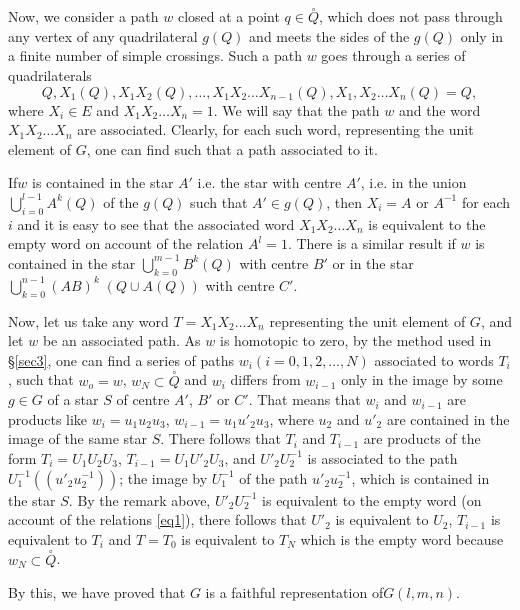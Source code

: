  Now, we consider a path $w$ closed at a point $q \in  \overset{\circ}{Q}$,
 which does not pass through any vertex of any quadrilateral $g(Q)$ and
 meets the sides of the $g(Q)$ only in a finite number of simple
 crossings. Such a path $w$ goes through a series of quadrilaterals 
 $$
Q, X_1 (Q), X_1 X_2 (Q), \ldots, X_1 X_2 \ldots X_{n-1}(Q), X_1, X_2
\ldots X_n (Q) = Q, 
 $$  
 where $X_i \in E$ and $X_1 X_2 \ldots X_n =1$. We will say that the
 path $w$ and  the word $X_1 X_2 \ldots X_n$ are associated. Clearly,
 for each such word, representing the unit element of $G$, one can find
 such that a path associated to it. 
 
 If\pageoriginale $w$ is contained in the star $A'$ i.e. the star with
 centre $A'$, i.e. in the union $\bigcup\limits_{i=0}^{l-1} A^k (Q)$
 of the $g(Q)$ such that $A' \in g(Q)$, then $X_i = A$ or $A^{-1}$ for
 each $i$ and 
 it is easy to  see that the associated word $X_1 X_2 \ldots X_n$ is
 equivalent to the empty word on account of the relation $A^l =
 1$. There is a similar result if $w$ is contained in the star
 $\bigcup\limits_{k=0}^{m-1} B^k(Q)$ with centre $B'$ or in the star
 $\bigcup\limits_{k=0}^{n-1} (AB)^k \; (Q \cup A(Q))$ with centre $C'$. 
 
 Now, let us take any word $T = X_1 X_2 \ldots X_n$ representing the
 unit element of $G$, and let $w$ be an associated path. As $w$ is
 homotopic to zero, by the method used in \S \ref{sec3}, one can find a series
 of paths $w_i (i = 0, 1, 2, \ldots, N)$ associated to words $T_i$,
 such that $w_o = w$, $w_N \subset \overset{\circ}{Q}$ and $w_i$ differs
 from $w_{i-1}$ only in the image by some $g \in G$ of a star $S$ of
 centre $A'$, $B'$ or $C'$. That means that $w_i$ and $w_{i-1}$ are
 products like $w_i = u_1 u_2 u_3 $, $w_{i-1} = u_1 u'_2 u_3$, where
 $u_2$ and $u'_2$ are contained in the image of the same star $S$.
 There follows that $T_i$ and $T_{i-1}$ are products of the form $T_i
 = U_1 U_2 U_3$, $T_{i-1} = U_1 U'_2 U_3$, and $U'_2 U^{-1}_2$ is
 associated to the path $U^{-1}_1 \left((u'_2 u^{-1}_2) \right)$; the image by
 $U^{-1}_1$ of the path $u'_2 u^{-1}_2$, which is contained in the
 star $S$. By the remark above, $U'_2 U^{-1}_2$ is equivalent to the
 empty word (on account of the relations \eqref{eq1}), there follows that
 $U'_2$ is equivalent to $U_2$, $T_{i-1}$ is equivalent to $T_i$ and
 $T = T_0$ is equivalent to $T_N$ which is the empty word because $w_N
 \subset \overset{\circ}{Q}$. 

 
 By this, we have proved that $G$ is a faithful representation of\break $G 
 (l,m,n)$. 
 
